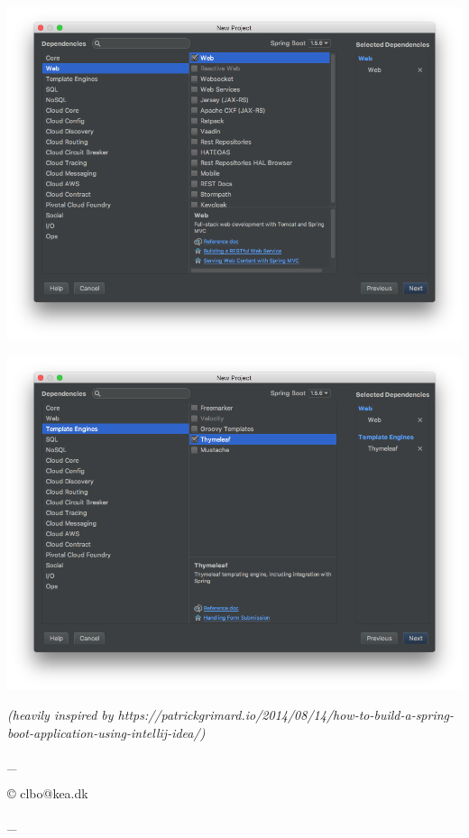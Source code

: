 \includegraphics{rsc/4.png}

\includegraphics{rsc/5.png}

\emph{(heavily inspired by
https://patrickgrimard.io/2014/08/14/how-to-build-a-spring-boot-application-using-intellij-idea/)}

\_

© clbo@kea.dk

\_
